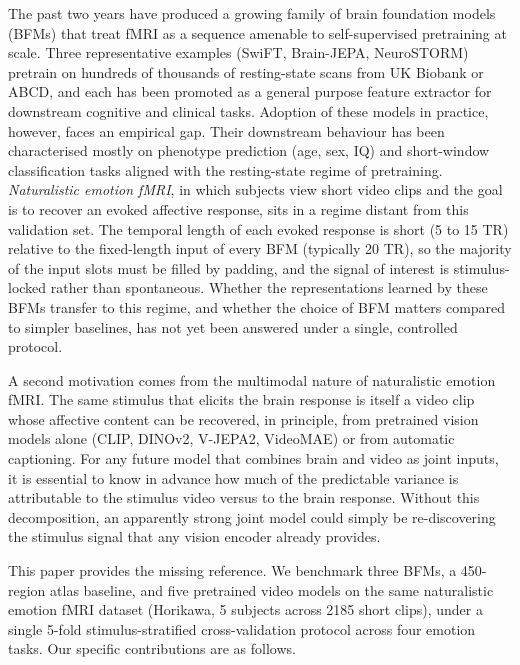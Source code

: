 \documentclass[11pt, a4paper]{article}
\begin{document}
The past two years have produced a growing family of brain foundation models (BFMs) that
treat fMRI as a sequence amenable to self-supervised pretraining at scale. Three
representative examples (SwiFT, Brain-JEPA, NeuroSTORM) pretrain on hundreds of thousands
of resting-state scans from UK Biobank or ABCD, and each has been promoted as a general
purpose feature extractor for downstream cognitive and clinical tasks. Adoption of these
models in practice, however, faces an empirical gap. Their downstream behaviour has been
characterised mostly on phenotype prediction (age, sex, IQ) and short-window classification
tasks aligned with the resting-state regime of pretraining. \emph{Naturalistic emotion
fMRI}, in which subjects view short video clips and the goal is to recover an evoked
affective response, sits in a regime distant from this validation set. The temporal length
of each evoked response is short (5 to 15 TR) relative to the fixed-length input of every
BFM (typically 20 TR), so the majority of the input slots must be filled by padding, and
the signal of interest is stimulus-locked rather than spontaneous. Whether the
representations learned by these BFMs transfer to this regime, and whether the choice of
BFM matters compared to simpler baselines, has not yet been answered under a single,
controlled protocol.

A second motivation comes from the multimodal nature of naturalistic emotion fMRI. The
same stimulus that elicits the brain response is itself a video clip whose affective
content can be recovered, in principle, from pretrained vision models alone (CLIP,
DINOv2, V-JEPA2, VideoMAE) or from automatic captioning. For any future model that
combines brain and video as joint inputs, it is essential to know in advance how much of
the predictable variance is attributable to the stimulus video versus to the brain
response. Without this decomposition, an apparently strong joint model could simply be
re-discovering the stimulus signal that any vision encoder already provides.

This paper provides the missing reference. We benchmark three BFMs, a 450-region atlas
baseline, and five pretrained video models on the same naturalistic emotion fMRI dataset
(Horikawa, 5 subjects across 2185 short clips), under a single 5-fold
stimulus-stratified cross-validation protocol across four emotion tasks. Our specific
contributions are as follows.
\end{document}
